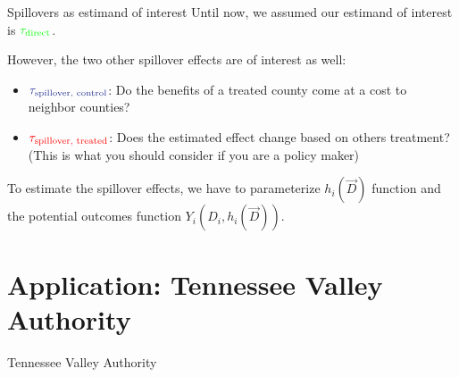 \documentclass[aspectratio=169]{beamer}
\begin{document}
\begin{frame}{Spillovers as estimand of interest}
    Until now, we assumed our estimand of interest is $\textcolor{green}{\tau_{\text{direct}}}$.

    However, the two other spillover effects are of interest as well:
    \begin{itemize}
        \item $\textcolor{purple}{\tau_{\text{spillover, control}}}$: Do the benefits of a treated county come at a cost to neighbor counties? 
        
        \item $\textcolor{red}{\tau_{\text{spillover, treated}}}$: Does the estimated effect change based on others treatment? (This is what you should consider if you are a policy maker)
    \end{itemize}

    To estimate the spillover effects, we have to parameterize $h_i(\vec{D})$ function and the potential outcomes function $Y_i(D_i, h_i(\vec{D}))$.
\end{frame}



\section{Application: Tennessee Valley Authority}

\begin{frame}{Tennessee Valley Authority}

\end{frame}
\end{document}
